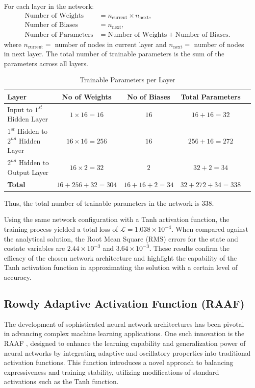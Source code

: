For each layer in the network:
\begin{align*}
\text{Number of  Weights} &=  n_\text{current} \times n_\text{next}, \\
\text{Number of Biases} &= n_\text{next}, \\
\text{Number of Parameters} &= \text{Number of Weights} + \text{Number of Biases}.
\end{align*}
where $ n_\text{current} = $ number of nodes in current layer and $ n_\text{next} = $ number of nodes in next layer. 
The total number of trainable parameters is the sum of the parameters across all layers.

\begin{table}[h!]
\centering
\caption{Trainable Parameters per Layer}
\label{tab:trainable-parameters}
\begin{tabular}{|l|c|c|c|c|}
\hline
\textbf{Layer} & \textbf{No of  Weights} & \textbf{No of  Biases} & \textbf{Total Parameters} \\
\hline
Input to $1^{st}$ Hidden Layer & $1 \times 16 = 16$ & $16$ & $16 + 16 = 32$ \\
\hline
$1^{st}$  Hidden to $2^{nd}$  Hidden Layer & $16 \times 16 = 256$ & $16$ & $256 + 16 = 272$ \\
\hline
$2^{nd}$ Hidden to Output Layer & $16 \times 2 = 32$ & $2$ & $32 + 2 = 34$ \\
\hline
\textbf{Total} & $16 + 256 + 32 = 304$ & $16 + 16 + 2 = 34$ & $32 + 272 + 34 = 338$ \\
\hline
\end{tabular}
\end{table}
Thus, the total number of trainable parameters in the network is \( 338 \).

Using the same network configuration with a Tanh activation function, the training process yielded a total loss of \( \mathcal{L} = 1.038 \times 10^{-4} \). When compared against the analytical solution, the Root Mean Square (RMS) errors for the state and costate variables are $2.44 \times 10^{-3}$ and $3.64 \times 10^{-3}$. These results confirm the efficacy of the chosen network architecture and highlight the capability of the Tanh activation function in approximating the solution with a certain level of accuracy.



\subsection{ Rowdy Adaptive Activation Function (RAAF)}
The development of sophisticated neural network architectures has been pivotal in advancing complex machine learning applications. One such innovation is the RAAF \cite{ccelik2024optimal}, designed to enhance the learning capability and generalization power of neural networks by integrating adaptive and oscillatory properties into traditional activation functions. This function introduces a novel approach to balancing expressiveness and training stability, utilizing modifications of standard activations such as the Tanh function.


